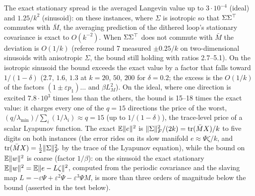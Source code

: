 The exact stationary spread is the averaged Langevin value up to $3\cdot10^{-4}$ (ideal) and $1.25/k^2$ (sinusoid): on
these instances, where $\Sigma$ is isotropic so that $\Sigma\Sigma^\top$ commutes with $\bar M$, the averaging prediction
of the dithered loop's stationary covariance is exact to $O(k^{-2})$. When $\Sigma\Sigma^\top$ does not commute with
$\bar M$ the deviation is $O(1/k)$ (referee round 7 measured $\pm0.25/k$ on two-dimensional sinusoids with
anisotropic $\Sigma$, the bound still holding with ratios 2.7--5.1). On the isotropic sinusoid the bound exceeds the exact value by a factor that falls toward $1/(1-\delta)$ ($2.7$, $1.6$,
$1.3$ at $k=20$, $50$, $200$ for $\delta=0.2$; the excess is the $O(1/k)$ of the factors $(1\pm\varepsilon p_1)\dots$
and $\beta L_M^2$). On the ideal, where one direction is excited $7.8\cdot10^3$ times less than the others, the
bound is 15--18 times the exact value: it charges every one of the $q=15$ directions the price of the worst,
$(q/\lambda_{\min})/\sum_i(1/\lambda_i)\approx q=15$ (up to $1/(1-\delta)$), the trace-level price of a scalar
Lyapunov function. The exact
$\mathbb{E}\lVert e\rVert^2$ is $\lVert \Sigma\rVert_F^2/(2k)=\operatorname{tr}(\bar MX)/k$ to five digits on both instances (the error rides on its slow
manifold $e\approx\Psi\zeta/k$, and $\operatorname{tr}(\bar MX)=\frac12\lVert \Sigma\rVert_F^2$ by the trace of the Lyapunov equation),
while the bound on $\mathbb{E}\lVert w\rVert^2$ is coarse (factor $1/\beta$): on the sinusoid the exact stationary
$\mathbb{E}\lVert w\rVert^2=\mathbb{E}\lVert e-L\zeta\rVert^2$, computed from the periodic covariance and the slaving map
$L=-\varepsilon\Psi+\varepsilon^2\dot\Psi-\varepsilon^3\Psi M$, is more than three orders of magnitude below the bound
(asserted in the test below).



